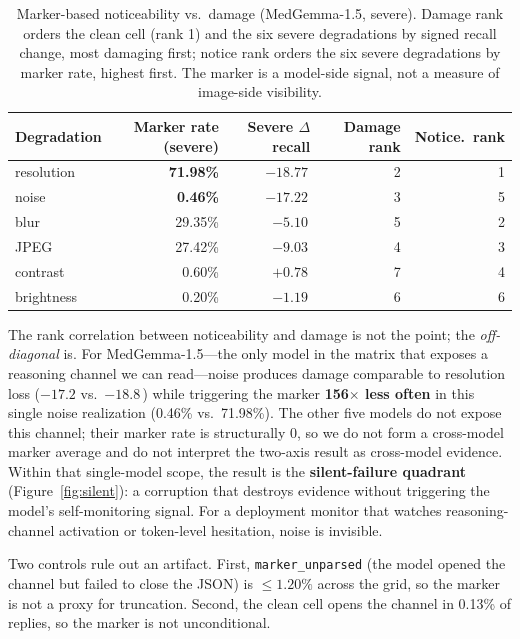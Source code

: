 \begin{table}[t]
\centering
\small
\caption{Marker-based noticeability vs.\ damage (MedGemma-1.5, severe). Damage rank orders the clean cell (rank 1) and the six severe degradations by signed recall change, most damaging first; notice rank orders the six severe degradations by marker rate, highest first. The marker is a model-side signal, not a measure of image-side visibility.}
\label{tab:twoaxis}
\begin{tabular}{lrrrr}
\toprule
Degradation & Marker rate (severe) & Severe $\Delta$ recall & Damage rank & Notice.\ rank \\
\midrule
resolution & \textbf{71.98\%} & $-18.77$\,\pp{} & 2 & 1 \\
noise & \textbf{0.46\%} & $-17.22$\,\pp{} & 3 & 5 \\
blur & 29.35\% & $-5.10$\,\pp{} & 5 & 2 \\
JPEG & 27.42\% & $-9.03$\,\pp{} & 4 & 3 \\
contrast & 0.60\% & $+0.78$\,\pp{} & 7 & 4 \\
brightness & 0.20\% & $-1.19$\,\pp{} & 6 & 6 \\
\bottomrule
\end{tabular}
\end{table}

The rank correlation between noticeability and damage is not the point; the \emph{off-diagonal} is. For MedGemma-1.5---the only model in the matrix that exposes a reasoning channel we can read---noise produces damage comparable to resolution loss ($-17.2$ vs.\ $-18.8$\,\pp{}) while triggering the marker \textbf{156$\times$ less often} in this single noise realization (0.46\% vs.\ 71.98\%). The other five models do not expose this channel; their marker rate is structurally 0, so we do not form a cross-model marker average and do not interpret the two-axis result as cross-model evidence. Within that single-model scope, the result is the \textbf{silent-failure quadrant} (Figure~\ref{fig:silent}): a corruption that destroys evidence without triggering the model's self-monitoring signal. For a deployment monitor that watches reasoning-channel activation or token-level hesitation, noise is invisible.

Two controls rule out an artifact. First, \texttt{marker\_unparsed} (the model opened the channel but failed to close the JSON) is $\le 1.20\%$ across the grid, so the marker is not a proxy for truncation. Second, the clean cell opens the channel in 0.13\% of replies, so the marker is not unconditional.

